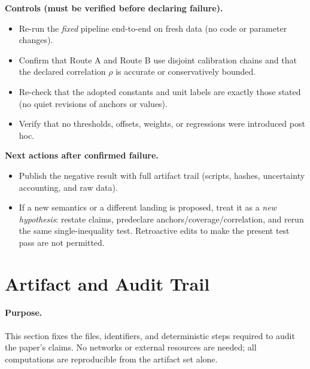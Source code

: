 \documentclass[11pt]{article}
\begin{document}
\textbf{Controls (must be verified before declaring failure).}
\begin{itemize}
  \item Re-run the \emph{fixed} pipeline end-to-end on fresh data (no code or parameter changes).
  \item Confirm that Route A and Route B use disjoint calibration chains and that the declared correlation \(\rho\) is accurate or conservatively bounded.
  \item Re-check that the adopted constants and unit labels are exactly those stated (no quiet revisions of anchors or values).
  \item Verify that no thresholds, offsets, weights, or regressions were introduced post hoc.
\end{itemize}

\textbf{Next actions after confirmed failure.}
\begin{itemize}
  \item Publish the negative result with full artifact trail (scripts, hashes, uncertainty accounting, and raw data).
  \item If a new semantics or a different landing is proposed, treat it as a \emph{new hypothesis}: restate claims, predeclare anchors/coverage/correlation, and rerun the same single-inequality test. Retroactive edits to make the present test pass are not permitted.
\end{itemize}

\section{Artifact and Audit Trail}

\paragraph{Purpose.}
This section fixes the files, identifiers, and deterministic steps required to audit the paper’s claims. No networks or external resources are needed; all computations are reproducible from the artifact set alone.
\end{document}
